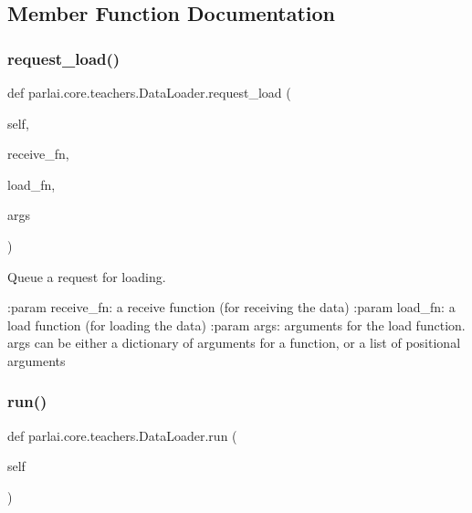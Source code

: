 \subsection{Member Function Documentation}
\mbox{\label{classparlai_1_1core_1_1teachers_1_1DataLoader_a06bfd397f84fd1e2d0d64d64182ae5f5}} 
\subsubsection{\texorpdfstring{request\+\_\+load()}{request\_load()}}
{\footnotesize\ttfamily def parlai.\+core.\+teachers.\+Data\+Loader.\+request\+\_\+load (\begin{DoxyParamCaption}\item[{}]{self,  }\item[{}]{receive\+\_\+fn,  }\item[{}]{load\+\_\+fn,  }\item[{}]{args }\end{DoxyParamCaption})}

\begin{DoxyVerb}Queue a request for loading.

:param receive_fn:
    a receive function (for receiving the data)
:param load_fn:
    a load function (for loading the data)
:param args:
    arguments for the load function. args can be either a dictionary of
    arguments for a function, or a list of positional arguments
\end{DoxyVerb}
 \mbox{\label{classparlai_1_1core_1_1teachers_1_1DataLoader_a2663781dd1e8cc85535e3cb075fbb8b7}} 
\subsubsection{\texorpdfstring{run()}{run()}}
{\footnotesize\ttfamily def parlai.\+core.\+teachers.\+Data\+Loader.\+run (\begin{DoxyParamCaption}\item[{}]{self }\end{DoxyParamCaption})}

